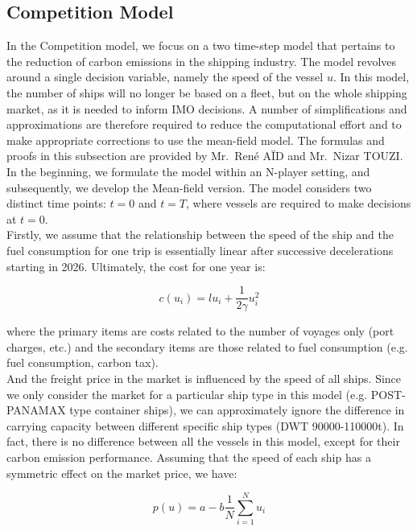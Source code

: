 \documentclass[a4paper,12pt]{article}
\begin{document}
\subsection{Competition Model}
In the Competition model, we focus on a two time-step model that pertains to the reduction of carbon emissions in the shipping industry.
The model revolves around a single decision variable, namely the speed of the vessel $u$.
In this model, the number of ships will no longer be based on a fleet, but on the whole shipping market, as it is needed to inform IMO decisions.
A number of simplifications and approximations are therefore required to reduce the computational effort and to make appropriate corrections to use the mean-field model.
The formulas and proofs in this subsection are provided by Mr.~René AÏD and Mr.~Nizar TOUZI.\\

In the beginning, we formulate the model within an N-player setting, and subsequently, we develop the Mean-field version. The model considers two distinct time points: $t = 0$ and $t = T$, where vessels are required to make decisions at $t = 0$.\\

Firstly, we assume that the relationship between the speed of the ship and the fuel consumption for one trip is essentially linear after successive decelerations starting in 2026. Ultimately, the cost for one year is:

\begin{equation}
	\label{eq:cost}
	c(u_i) = l u_i + \frac{1}{2 \gamma} u_i^2
\end{equation}

where the primary items are costs related to the number of voyages only (port charges, etc.) and the secondary items are those related to fuel consumption (e.g. fuel consumption, carbon tax).\\

And the freight price in the market is influenced by the speed of all ships.
Since we only consider the market for a particular ship type in this model (e.g. POST-PANAMAX type container ships), we can approximately ignore the difference in carrying capacity between different specific ship types (DWT 90000-110000t). In fact, there is no difference between all the vessels in this model, except for their carbon emission performance. Assuming that the speed of each ship has a symmetric effect on the market price, we have:

\begin{equation}
	\label{eq:price}
	p(u) = a - b \frac{1}{N}\sum_{i=1}^N u_i
\end{equation}
\end{document}
